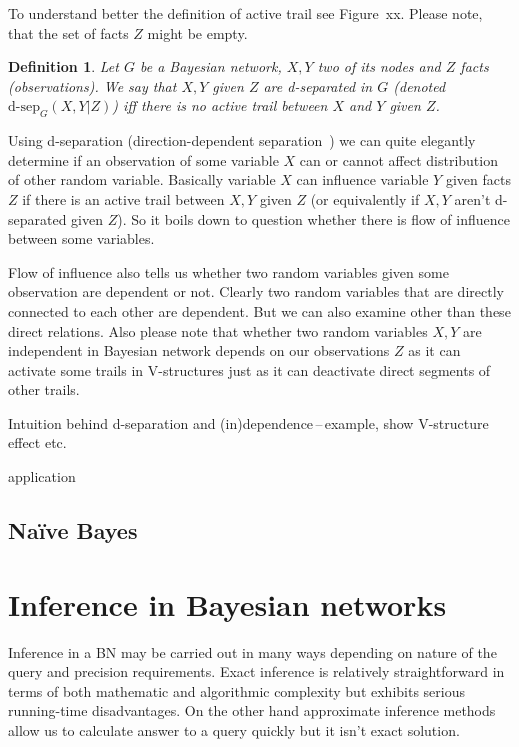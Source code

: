 \documentclass[english,cover]{fitthesis} %
\newtheorem{math_def}{Definition}[chapter] %
\newcommand{\todo}[1]{{\color{red} #1}}
\begin{document}
\todo{To understand better the definition of active trail see Figure~xx. Please note, that the set of facts $Z$ might be empty.}

\begin{math_def}
    Let $G$ be a Bayesian network, $X,Y$ two of its nodes and $Z$ facts (observations). We say that $X,Y$ given $Z$ are d-separated in $G$ (denoted $\text{d-sep}_G(X,Y|Z)$) iff there is no active trail between $X$ and $Y$ given $Z$.
\end{math_def}

Using d-separation (direction-dependent separation~\cite{russel_norvig_2ed}) we can quite elegantly determine if an observation of some variable $X$ can or cannot affect distribution of other random variable. Basically variable $X$ can influence variable $Y$ given facts $Z$ if there is an active trail between $X,Y$ given $Z$ (or equivalently if $X,Y$ aren't d-separated given $Z$). So it boils down to question whether there is flow of influence between some variables.

Flow of influence also tells us whether two random variables given some observation are dependent or not. Clearly two random variables that are directly connected to each other are dependent. But we can also examine other than these direct relations. Also please note that whether two random variables $X,Y$ are independent in Bayesian network depends on our observations $Z$ as it can activate some trails in V-structures just as it can deactivate direct segments of other trails.

\todo{Intuition behind d-separation and (in)dependence\,--\,example, show V-structure effect etc.}

\todo{application}







\subsection{Naïve Bayes}












\section{Inference in Bayesian networks}
Inference in a BN may be carried out in many ways depending on nature of the query and precision requirements. Exact inference is relatively straightforward in terms of both mathematic and algorithmic complexity but exhibits serious running-time disadvantages. On the other hand approximate inference methods allow us to calculate answer to a query quickly but it isn't exact solution.
\end{document}

